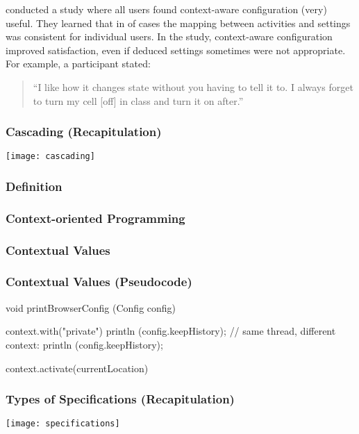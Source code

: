\begin{frame}
	\citet{khalil2005context} conducted a study where all users found context-aware configuration (very) useful.
	They learned that in  of cases the mapping between activities and settings was consistent for individual users.
	In the study, context-aware configuration improved satisfaction, even if deduced settings sometimes were not appropriate.
	For example, a participant stated:
	\vspace{2em}

	\begin{quote}
	``I like how it changes state without you having to tell it to. I always forget to turn my cell [off] in class and turn it on after.''
	\end{quote}
\end{frame}

\begin{frame}
	\frametitle{Cascading (Recapitulation)}
	\texttt{[image: cascading]}
\end{frame}

\begin{frame}
	\frametitle{Definition}
\end{frame}

\begin{frame}
	\frametitle{Context-oriented Programming}
\end{frame}

\begin{frame}
	\frametitle{Contextual Values}
\end{frame}

\begin{frame}[fragile]
	\frametitle{Contextual Values (Pseudocode)}

	\begin{code}[gobble=4,language=C++,morekeywords={context}]
	void printBrowserConfig (Config config)
	{
		context.with("private")
		{
			println (config.keepHistory);
		}
		// same thread, different context:
		println (config.keepHistory);

		context.activate(currentLocation)
	}
	\end{code}
\end{frame}

\begin{frame}
	\frametitle{Types of Specifications (Recapitulation)}
	\texttt{[image: specifications]}
\end{frame}

